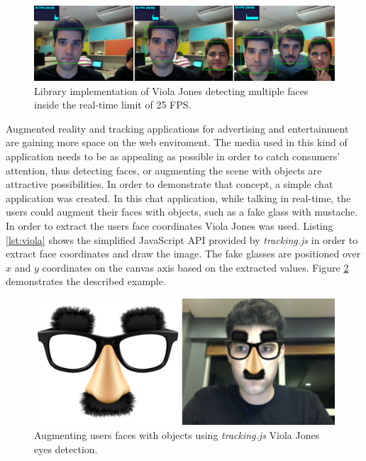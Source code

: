 \begin{figure}[!htb]
  \centering
  \includegraphics[width=\linewidth]{chapters/evaluation/viola.png}
  \caption{Library implementation of Viola Jones detecting multiple faces inside the real-time limit of 25 FPS.}
  \label{figure:viola_multiple_faces}
\end{figure}

Augmented reality and tracking applications for advertising and entertainment are gaining more space on the web enviroment. The media used in this kind of application needs to be as appealing as possible in order to catch consumers' attention, thus detecting faces, or augmenting the scene with objects are attractive possibilities. In order to demonstrate that concept, a simple chat application was created. In this chat application, while talking in real-time, the users could augment their faces with objects, such as a fake glass with mustache. In order to extract the users face coordinates Viola Jones was used. Listing \ref{lst:viola} shows the simplified JavaScript API provided by \textit{tracking.js} in order to extract face coordinates and draw the image. The fake glasses are positioned over $x$ and $y$ coordinates on the canvas axis based on the extracted values. Figure \ref{figure:viola_glass_face} demonstrates the described example.

\begin{figure}[!htb]
  \centering
  \includegraphics[width=380pt]{chapters/evaluation/viola_glass_face.png}
  \caption{Augmenting users faces with objects using \textit{tracking.js} Viola Jones eyes detection.}
  \label{figure:viola_glass_face}
\end{figure}

